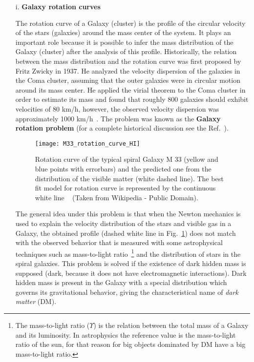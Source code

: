 \begin{itemize}
\item[i.] \textbf{Galaxy rotation curves}

The rotation curve of a Galaxy (cluster) is the profile of the circular velocity
of the stars (galaxies) around the mass center of the system. 
It plays an important role because it is possible
to infer the mass distribution of the Galaxy (cluster)  after the analysis of this profile. 
Historically, the relation between the mass distribution and the rotation curve was first proposed by Fritz Zwicky in 1937.
He analyzed the velocity dispersion of the galaxies in the Coma cluster, assuming that the outer galaxies were in circular motion around its mass center.
He applied the virial theorem to the Coma cluster in order to estimate its mass and found that roughly 800 galaxies should  exhibit velocities of 80 km/h, however, the observed velocity dispersion was approximately 1000 km/h~\cite{1937ApJ-86-217Z}. 
The problem was known as the \textbf{Galaxy rotation problem} (for a complete historical discussion see the Ref.~\cite{Bertone:2016nfn}). 
%
\begin{figure}[h]
\begin{center}
\texttt{[image: M33\_rotation\_curve\_HI]}
\end{center}
\caption{Rotation curve of the typical spiral Galaxy M 33 (yellow and blue points with errorbars) and the predicted one from the distribution of the visible matter (white dashed line). The best fit model for rotation curve is represented by the continuous white line ~\cite{Corbelli:1999af} (Taken from Wikipedia - Public Domain).}
\label{fig:M33}
\end{figure}
%
The general idea under this problem is that when the Newton mechanics is used to explain the velocity distribution of the stars and visible gas in a Galaxy, the obtained profile (dashed white line in Fig.~\ref{fig:M33}) does not match with the observed behavior that is measured with some astrophysical techniques such as mass-to-light ratio~\footnote{The mass-to-light ratio ($\Upsilon$) is the relation between the total mass of a Galaxy and its luminosity. In astrophysics the reference value is the mass-to-light ratio of the sun, for that reason for big objects dominated by DM have a big mass-to-light ratio.} and the distribution of stars in the spiral galaxies.  
This problem is solved if the existence of dark hidden mass is supposed (dark, because it does not have electromagnetic interactions). Dark hidden mass is present in the Galaxy with a special distribution which governs its gravitational behavior, giving the characteristical name of \textit{dark matter} (DM).











\end{itemize}
